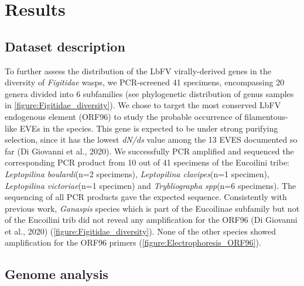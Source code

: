 \section{Results}

\subsection{Dataset description}

To further assess the distribution of the LbFV virally-derived genes in the diversity of \textit{Figitidae} wasps, we PCR-screened 41 specimens, encompassing 20 genera divided into 6 subfamilies (see phylogenetic distribution of genus samples in \figurename{\ref{figure:Figitidae_diversity}}). We chose to target the most conserved LbFV endogenous element (ORF96) to study the probable occurrence of filamentous-like EVEs in the species. This gene is expected to be under strong purifying selection, since it has the lowest \textit{dN/ds} value among the 13 EVES documented so far (Di Giovanni et al., 2020). We successfully PCR amplified and sequenced the corresponding PCR product from 10 out of 41 specimens of the Eucoilini tribe: \textit{Leptopilina boulardi}(n=2 specimens), \textit{Leptopilina clavipes}(n=1 specimen), \textit{Leptopilina victoriae}(n=1 specimen) and \textit{Trybliographa spp}(n=6 specimens). The sequencing of all PCR products gave the expected sequence. Consistently with previous work, \textit{Ganaspis} species which is part of the Eucoilinae subfamily but not of the Eucoilini trib did not reveal any amplification for the ORF96 (Di Giovanni et al., 2020) (\figurename{\ref{figure:Figitidae_diversity}}). None of the other species showed amplification for the ORF96 primers (\figurename{\ref{figure:Electrophoresis_ORF96}}).

\subsection{Genome analysis}

